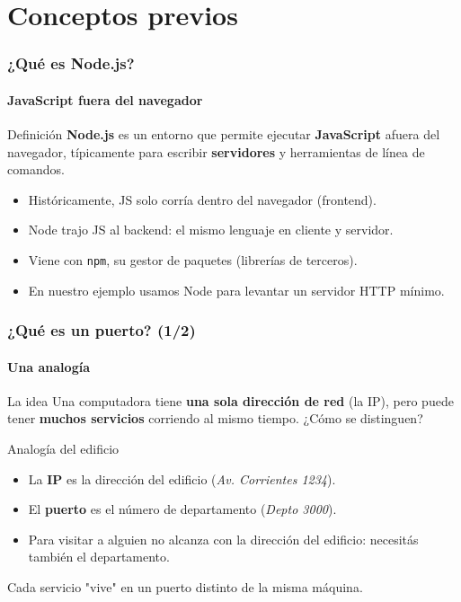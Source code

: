 \section{Conceptos previos}


\begin{frame}
    \frametitle{¿Qué es Node.js?}
    \framesubtitle{JavaScript fuera del navegador}

    \begin{block}{Definición}
        \textbf{Node.js} es un entorno que permite ejecutar \textbf{JavaScript} afuera del navegador, típicamente para escribir \textbf{servidores} y herramientas de línea de comandos.
    \end{block}

    \begin{itemize}
        \item Históricamente, JS solo corría dentro del navegador (frontend).
        \item Node trajo JS al backend: el mismo lenguaje en cliente y servidor.
        \item Viene con \texttt{npm}, su gestor de paquetes (librerías de terceros).
        \item En nuestro ejemplo usamos Node para levantar un servidor HTTP mínimo.
    \end{itemize}
\end{frame}



\begin{frame}
    \frametitle{¿Qué es un puerto? (1/2)}
    \framesubtitle{Una analogía}

    \begin{block}{La idea}
        Una computadora tiene \textbf{una sola dirección de red} (la IP), pero puede tener \textbf{muchos servicios} corriendo al mismo tiempo. ¿Cómo se distinguen?
    \end{block}

    \begin{block}{Analogía del edificio}
        \begin{itemize}
            \item La \textbf{IP} es la dirección del edificio (\textit{Av. Corrientes 1234}).
            \item El \textbf{puerto} es el número de departamento (\textit{Depto 3000}).
            \item Para visitar a alguien no alcanza con la dirección del edificio: necesitás también el departamento.
        \end{itemize}
    \end{block}

    Cada servicio "vive" en un puerto distinto de la misma máquina.
\end{frame}

